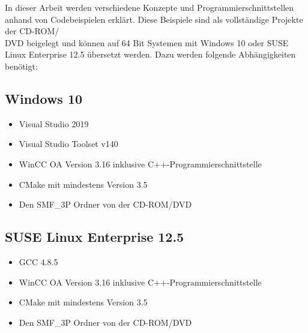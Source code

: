 In dieser Arbeit werden verschiedene Konzepte und Programmierschnittstellen anhand von Codebeispielen erklärt. Diese Beispiele sind
als vollständige Projekte der CD-ROM/\\DVD beigelegt und können auf 64 Bit Systemen mit Windows 10 oder SUSE Linux Enterprise 12.5 
übersetzt werden. Dazu werden folgende Abhängigkeiten benötigt: 

\subsection{Windows 10}

\begin{itemize}
  \item Visual Studio 2019
  \item Visual Studio Toolset v140
  \item WinCC OA Version 3.16 inklusive C++-Programmierschnittstelle
  \item CMake mit mindestens Version 3.5
  \item Den SMF\_3P Ordner von der CD-ROM/DVD
\end{itemize}

\subsection{SUSE Linux Enterprise 12.5}

\begin{itemize}
  \item GCC 4.8.5
  \item WinCC OA Version 3.16 inklusive C++-Programmierschnittstelle
  \item CMake mit mindestens Version 3.5
  \item Den SMF\_3P Ordner von der CD-ROM/DVD
\end{itemize}